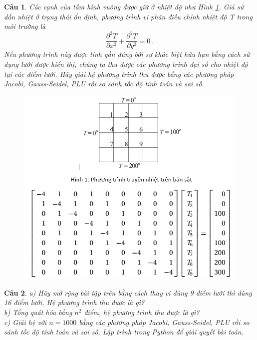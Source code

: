 \documentclass[11pt]{article}
\newtheorem{bt}{Câu}
\begin{document}
\begin{bt}
Các cạnh của tấm hình vuông được giữ ở nhiệt độ như Hình \ref{fig:heatequation}. Giả sử dẫn nhiệt ở trạng thái ổn định, phương trình vi phân điều chỉnh nhiệt độ T trong môi trường là
%
\[
\dfrac{\partial^2 T}{\partial x^2} + \dfrac{\partial^2 T}{\partial y^2} = 0 \ .
\]
%
Nếu phương trình này được tính gần đúng bởi sự khác biệt hữu hạn bằng cách sử dụng lưới được hiển thị, chúng ta thu được các phương trình đại số cho nhiệt độ tại các điểm lưới.	
Hãy giải hệ phương trình thu được bằng các phương pháp Jacobi, Gauss-Seidel, PLU rồi so sánh tốc độ tính toán và sai số.
%
\begin{figure}[h!]
	\centering
	\includegraphics[width=0.7\linewidth]{Figures/heat_equation_3}
	\label{fig:heatequation}
\end{figure}
%
\end{bt}

\begin{bt}
a) Hãy mở rộng bài tập trên bằng cách thay vì dùng 9 điểm lưới thì dùng 16 điểm lưới. Hệ phương trình thu được là gì? \\
b) Tổng quát hóa bằng $n^2$ điểm, hệ phương trình thu được là gì? \\
c) Giải hệ với $n = 1000$ bằng các phương pháp Jacobi, Gauss-Seidel, PLU rồi so sánh tốc độ tính toán và sai số. Lập trình trong Python để giải quyết bài toán.
\end{bt}
\end{document}
